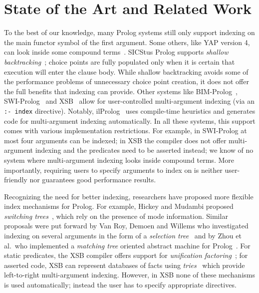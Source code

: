 \documentclass{llncs}
\newcommand{\code}[1]{\texttt{#1}}
\begin{document}
\section{State of the Art and Related Work} \label{sec:related}
To the best of our knowledge, many Prolog systems still only support
indexing on the main functor symbol of the first argument. Some
others, like YAP version 4, can look inside some compound
terms~\cite{YAP}. SICStus Prolog supports \emph{shallow
  backtracking}~\cite{ShallowBacktracking@ICLP-89}; choice points are
fully populated only when it is certain that execution will enter the
clause body. While shallow backtracking avoids some of the performance
problems of unnecessary choice point creation, it does not offer the
full benefits that indexing can provide. Other systems like
BIM-Prolog~\cite{IndexingProlog@NACLP-89}, SWI-Prolog~\cite{SWI} and
XSB~\cite{XSB} allow for user-controlled multi-argument indexing (via
an \code{:-~index} directive). Notably, ilProlog~\cite{ilProlog} uses
compile-time heuristics and generates code for multi-argument indexing
automatically. In all these systems, this support comes with various
implementation restrictions. For example, in SWI-Prolog at most four
arguments can be indexed; in XSB the compiler does not offer
multi-argument indexing and the predicates need to be asserted
instead; we know of no system where multi-argument indexing looks
inside compound terms. More importantly, requiring users to specify
arguments to index on is neither user-friendly nor guarantees good
performance results.

Recognizing the need for better indexing, researchers have proposed
more flexible index mechanisms for Prolog. For example, Hickey and
Mudambi proposed \emph{switching trees}~\cite{HickeyMudambi@JLP-89},
which rely on the presence of mode information. Similar proposals were
put forward by Van Roy, Demoen and Willems who investigated indexing
on several arguments in the form of a \emph{selection tree}~\cite{VRDW87}
and by Zhou et al.\ who implemented a \emph{matching tree} oriented
abstract machine for Prolog~\cite{TOAM@ICLP-90}. For static
predicates, the XSB compiler offers support for \emph{unification
factoring}~\cite{UnifFact@POPL-95}; for asserted code, XSB can
represent databases of facts using \emph{tries}~\cite{Tries@JLP-99}
which provide left-to-right multi-argument indexing. However, in XSB
none of these mechanisms is used automatically; instead the user has
to specify appropriate directives.
\end{document}
